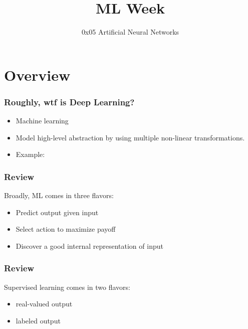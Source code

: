 
\title
{ML Week}
\subtitle{0x05 \hspace{2mm}  Artificial Neural Networks}




\begin{frame}
  \titlepage
\end{frame}

\section{Overview}

\begin{frame}
  \frametitle{Roughly, wtf is Deep Learning?}
  \begin{itemize}
  \item<1-> Machine learning
  \item<1-> Model high-level abstraction by using multiple non-linear
    transformations.
  \item<2-> Example: 
  \end{itemize}
\end{frame}

\begin{frame}
  \frametitle{Review}
  Broadly, ML comes in three flavors:
  \begin{itemize}
  \item {} Predict output given input
  \item {} Select action to maximize payoff
  \item {} Discover a good internal
    representation of input
  \end{itemize}
\end{frame}

\begin{frame}
  \frametitle{Review}
  Supervised learning comes in two flavors:
  \begin{itemize}
  \item {} real-valued output
  \item {} labeled output
  \end{itemize}
\end{frame}

